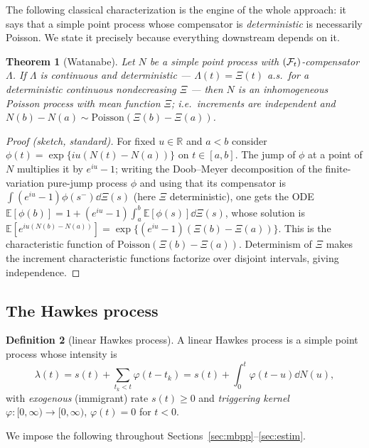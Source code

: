 \documentclass[11pt]{article}
\theoremstyle{plain}
\newtheorem{theorem}{Theorem}[section]
\theoremstyle{definition}
\newtheorem{definition}[theorem]{Definition}
\theoremstyle{remark}
\newcommand{\R}{\mathbb{R}}\newcommand{\N}{\mathbb{N}}\newcommand{\E}{\mathbb{E}}
\begin{document}
The following classical characterization is the engine of the whole approach: it
says that a simple point process whose compensator is \emph{deterministic} is
necessarily Poisson. We state it precisely because everything downstream depends
on it.

\begin{theorem}[Watanabe]
\label{thm:watanabe}
Let $N$ be a simple point process with $(\mathcal{F}_t)$-compensator $\Lambda$. If
$\Lambda$ is continuous and \emph{deterministic} --- $\Lambda(t)=\Xi(t)$ a.s.\ for
a deterministic continuous nondecreasing $\Xi$ --- then $N$ is an inhomogeneous
Poisson process with mean function $\Xi$; i.e.\ increments are independent and
$N(b)-N(a)\sim\mathrm{Poisson}(\Xi(b)-\Xi(a))$.
\end{theorem}
\begin{proof}[Proof (sketch, standard)]
For fixed $u\in\R$ and $a<b$ consider $\phi(t)=\exp\{iu(N(t)-N(a))\}$ on $t\in[a,b]$.
The jump of $\phi$ at a point of $N$ multiplies it by $e^{iu}-1$; writing the
Doob--Meyer decomposition of the finite-variation pure-jump process $\phi$ and
using that its compensator is $\int(e^{iu}-1)\phi(s^-)\dd\Xi(s)$ (here $\Xi$
deterministic), one gets the ODE
$\E[\phi(b)]=1+(e^{iu}-1)\int_a^b\E[\phi(s)]\dd\Xi(s)$, whose solution is
$\E[e^{iu(N(b)-N(a))}]=\exp\{(e^{iu}-1)(\Xi(b)-\Xi(a))\}$. This is the
characteristic function of $\mathrm{Poisson}(\Xi(b)-\Xi(a))$. Determinism of
$\Xi$ makes the increment characteristic functions factorize over disjoint
intervals, giving independence.
\end{proof}

\subsection{The Hawkes process}

\begin{definition}[linear Hawkes process]
\label{def:hawkes}
A linear Hawkes process is a simple point process whose intensity is
\begin{equation}
\lambda(t)=s(t)+\sum_{t_k<t}\varphi(t-t_k)=s(t)+\int_0^t\varphi(t-u)\dd N(u),
\label{eq:hawkes}
\end{equation}
with \emph{exogenous} (immigrant) rate $s(t)\ge0$ and \emph{triggering kernel}
$\varphi:[0,\infty)\to[0,\infty)$, $\varphi(t)=0$ for $t<0$.
\end{definition}

We impose the following throughout Sections~\ref{sec:mbpp}--\ref{sec:estim}.
\end{document}
